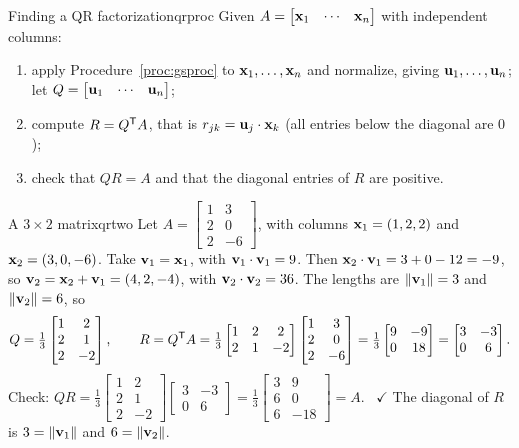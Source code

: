 \documentclass[11pt]{article}
\begin{document}
\begin{proc}{Finding a QR factorization}{qrproc}
Given $A=\begin{bmatrix}\mathbf{x}_1&\cdots&\mathbf{x}_n\end{bmatrix}$ with independent columns:
\begin{enumerate}[nosep]
  \item apply Procedure~\ref{proc:gsproc} to $\mathbf{x}_1,\dots,\mathbf{x}_n$ and normalize, giving $\mathbf{u}_1,\dots,\mathbf{u}_n$; let $Q=\begin{bmatrix}\mathbf{u}_1&\cdots&\mathbf{u}_n\end{bmatrix}$;
  \item compute $R=Q^{\mathsf T} A$, that is $r_{jk}=\mathbf{u}_j\cdot\mathbf{x}_k$ (all entries below the diagonal are $0$);
  \item check that $QR=A$ and that the diagonal entries of $R$ are positive.
\end{enumerate}
\end{proc}

\begin{exmp}{A $3\times2$ matrix}{qrtwo}
Let $A=\begin{bmatrix}1&3\\2&0\\2&-6\end{bmatrix}$, with columns $\mathbf{x}_1=(1,2,2)$ and $\mathbf{x}_2=(3,0,-6)$. Take $\mathbf{v}_1=\mathbf{x}_1$, with $\mathbf{v}_1\cdot\mathbf{v}_1=9$. Then $\mathbf{x}_2\cdot\mathbf{v}_1=3+0-12=-9$, so $\mathbf{v}_2=\mathbf{x}_2+\mathbf{v}_1=(4,2,-4)$, with $\mathbf{v}_2\cdot\mathbf{v}_2=36$. The lengths are $\lVert\mathbf{v}_1\rVert=3$ and $\lVert\mathbf{v}_2\rVert=6$, so
\[
Q=\tfrac13\begin{bmatrix}1&2\\2&1\\2&-2\end{bmatrix},\qquad R=Q^{\mathsf T} A=\tfrac13\begin{bmatrix}1&2&2\\2&1&-2\end{bmatrix}\begin{bmatrix}1&3\\2&0\\2&-6\end{bmatrix}=\tfrac13\begin{bmatrix}9&-9\\0&18\end{bmatrix}=\begin{bmatrix}3&-3\\0&6\end{bmatrix}.
\]
Check: $QR=\tfrac13\begin{bmatrix}1&2\\2&1\\2&-2\end{bmatrix}\begin{bmatrix}3&-3\\0&6\end{bmatrix}=\tfrac13\begin{bmatrix}3&9\\6&0\\6&-18\end{bmatrix}=A$. \ $\checkmark$ The diagonal of $R$ is $3=\lVert\mathbf{v}_1\rVert$ and $6=\lVert\mathbf{v}_2\rVert$.
\end{exmp}
\end{document}
